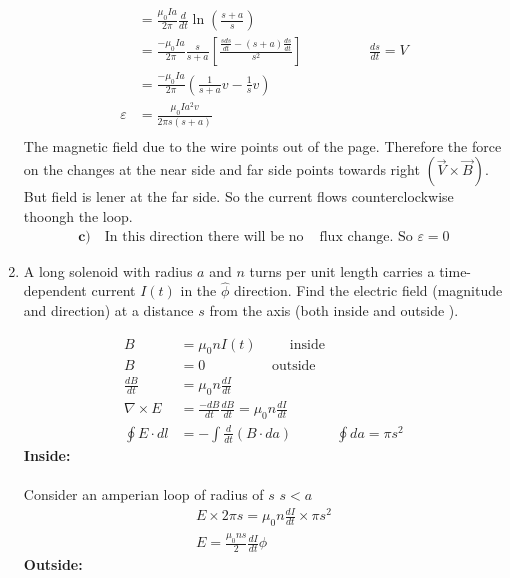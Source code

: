 \begin{enumerate}[ label=\color{ocre}\textbf{\arabic*.}]
\begin{answer}
\begin{align*}
		&=\frac{\mu_{0}I a}{2 \pi} \frac{d}{dt}\ln \left(\frac{s+a}{s}\right)\\
		&=\frac{-\mu_{0} Ia}{2 \pi} \frac{s}{s+a} \left[\frac{\frac{s d s}{d t}-(s+a) \frac{d s}{d t}}{s^{2}}\right]\hspace{2cm}\frac{ds}{dt}=V\\
		&=\frac{-\mu_{0} I a}{2 \pi}\left(\frac{1}{s+a} v-\frac{1}{s} v\right)\\
		\varepsilon&=\frac{\mu_{0} I a^{2} v}{2 \pi s(s+a)}
		\\
		\end{align*}
		The magnetic field due to the wire points out of the page. Therefore the force on the changes at the near side and far side points towards right $(\vec{V}\times\vec{B})$. But field is lener at the far side. So the current flows counterclockwise thoongh the loop.
		\begin{align*}
		\textbf{c)}\quad \text{In this direction there will be no }&\text{flux change. So $\varepsilon=0$}
		\end{align*}
	\end{answer}
	\item A long solenoid with radius $a$ and $n$ turns per unit length carries a time-dependent current $I(t)$ in the $\hat{\phi}$ direction. Find the electric field (magnitude and direction) at a distance $s$ from the axis (both inside and outside ).
	\begin{answer}
		\begin{align*}
		B&=\mu_{0}nI(t) \hspace{1cm} \text{inside}\\
		B&=0\hspace{2cm}\text{outside}\\
		\frac{dB}{dt}&=\mu_{0}n \frac{dI}{dt}\\
		\nabla\times E&=\frac{-dB}{dt}  \frac{dB}{dt}=\mu_{0}n \frac{dI}{dt}\\
		\oint E\cdot dl&=-\int\frac{d}{dt}(B\cdot da)&\oint da=\pi s^2
		\end{align*}
		\textbf{Inside:}\\\\
		Consider an amperian loop of radius of $s$ \quad $s<a$
		\begin{align*}
		E\times2\pi s=\mu_{0}n \frac{dI}{dt}\times\pi s^2\\
		E=\frac{\mu_{0}n s}{2}\frac{dI}{dt}\hat{\phi}
		\end{align*}
		\textbf{Outside:}\\
		\opencutright
		\renewcommand\windowpagestuff{
}
\end{answer}
\end{enumerate}
